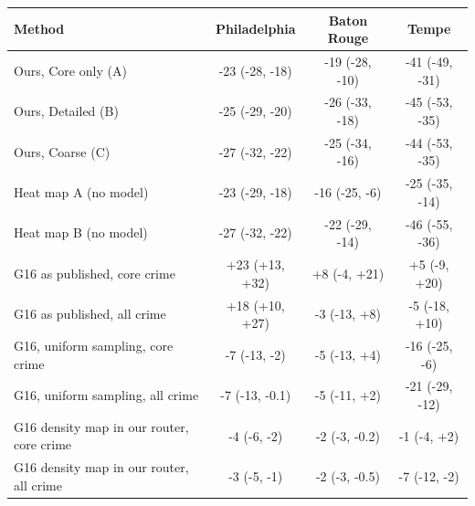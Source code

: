 \begin{tabular}{lccc}
\toprule
Method & Philadelphia & Baton Rouge & Tempe \\
\midrule
Ours, Core only (A) & -23 (-28, -18) & -19 (-28, -10) & -41 (-49, -31) \\
Ours, Detailed (B) & -25 (-29, -20) & -26 (-33, -18) & -45 (-53, -35) \\
Ours, Coarse (C) & -27 (-32, -22) & -25 (-34, -16) & -44 (-53, -35) \\
Heat map A (no model) & -23 (-29, -18) & -16 (-25, -6) & -25 (-35, -14) \\
Heat map B (no model) & -27 (-32, -22) & -22 (-29, -14) & -46 (-55, -36) \\
\midrule
G16 as published, core crime & +23 (+13, +32) & +8 (-4, +21) & +5 (-9, +20) \\
G16 as published, all crime & +18 (+10, +27) & -3 (-13, +8) & -5 (-18, +10) \\
G16, uniform sampling, core crime & -7 (-13, -2) & -5 (-13, +4) & -16 (-25, -6) \\
G16, uniform sampling, all crime & -7 (-13, -0.1) & -5 (-11, +2) & -21 (-29, -12) \\
G16 density map in our router, core crime & -4 (-6, -2) & -2 (-3, -0.2) & -1 (-4, +2) \\
G16 density map in our router, all crime & -3 (-5, -1) & -2 (-3, -0.5) & -7 (-12, -2) \\
\bottomrule
\end{tabular}

